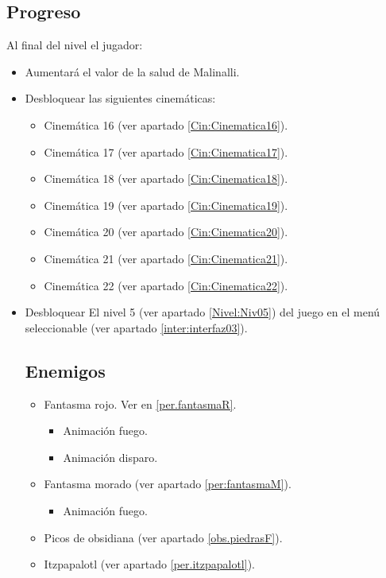         \subsection{Progreso}
Al final del nivel el jugador:
\begin{itemize}
        \item Aumentará el valor de la salud de Malinalli.
        \item Desbloquear las siguientes cinemáticas:
		\begin{itemize}
			\item Cinemática 16 (ver apartado \ref{Cin:Cinematica16}).
			\item Cinemática 17 (ver apartado \ref{Cin:Cinematica17}).
			\item Cinemática 18 (ver apartado \ref{Cin:Cinematica18}).
			\item Cinemática 19 (ver apartado \ref{Cin:Cinematica19}).
			\item Cinemática 20 (ver apartado \ref{Cin:Cinematica20}).
			\item Cinemática 21 (ver apartado \ref{Cin:Cinematica21}).
			\item Cinemática 22 (ver apartado \ref{Cin:Cinematica22}).
		\end{itemize}
        \item Desbloquear El nivel 5 (ver apartado \ref{Nivel:Niv05}) del juego en el menú seleccionable (ver apartado \ref{inter:interfaz03}).
        \subsection{Enemigos}
                \begin{itemize}
                        \item Fantasma rojo. Ver en \ref{per.fantasmaR}. 
            \begin{itemize}
				\item Animación fuego.
				\item Animación disparo.
			\end{itemize}
			\item Fantasma morado (ver apartado \ref{per:fantasmaM}).
			\begin{itemize}
				\item Animación fuego.
			\end{itemize}
            \item Picos de obsidiana (ver apartado \ref{obs.piedrasF}).
             \item Itzpapalotl (ver apartado \ref{per.itzpapalotl}).
                \end{itemize}

\end{itemize}

